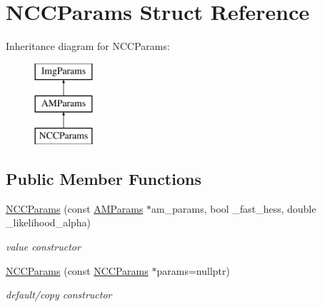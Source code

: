 \hypertarget{structNCCParams}{\section{N\-C\-C\-Params Struct Reference}
\label{structNCCParams}
}
Inheritance diagram for N\-C\-C\-Params\-:\begin{figure}[H]
\begin{center}
\leavevmode
\includegraphics[height=3.000000cm]{structNCCParams}
\end{center}
\end{figure}
\subsection*{Public Member Functions}
\begin{DoxyCompactItemize}
\item 
\hypertarget{structNCCParams_a792823877cfb2c7c3e2cc8b29e19a0a7}{\hyperlink{structNCCParams_a792823877cfb2c7c3e2cc8b29e19a0a7}{N\-C\-C\-Params} (const \hyperlink{structAMParams}{A\-M\-Params} $\ast$am\-\_\-params, bool \-\_\-fast\-\_\-hess, double \-\_\-likelihood\-\_\-alpha)}\label{structNCCParams_a792823877cfb2c7c3e2cc8b29e19a0a7}

\begin{DoxyCompactList}\small\item\em value constructor \end{DoxyCompactList}\item 
\hypertarget{structNCCParams_a42ac2c56df37193dbdd567eab5ad1f06}{\hyperlink{structNCCParams_a42ac2c56df37193dbdd567eab5ad1f06}{N\-C\-C\-Params} (const \hyperlink{structNCCParams}{N\-C\-C\-Params} $\ast$params=nullptr)}\label{structNCCParams_a42ac2c56df37193dbdd567eab5ad1f06}

\begin{DoxyCompactList}\small\item\em default/copy constructor \end{DoxyCompactList}\end{DoxyCompactItemize}
